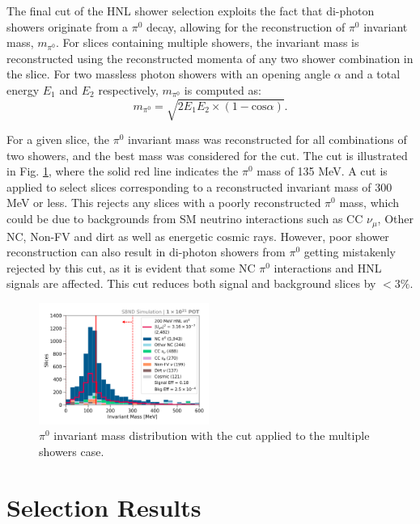 The final cut of the HNL shower selection exploits the fact that di-photon showers originate from a $\pi^0$ decay, allowing for the reconstruction of $\pi^0$ invariant mass, $m_{\pi^0}$.
For slices containing multiple showers, the invariant mass is reconstructed using the reconstructed momenta of any two shower combination in the slice.
For two massless photon showers with an opening angle $\alpha$ and a total energy $E_1$ and $E_2$ respectively, $m_{\pi^0}$ is computed as:
\begin{equation}
	m_{\pi^0} = \sqrt{2 E_1 E_2 \times (1 - \mbox{cos}\alpha)}.
\end{equation}

For a given slice, the $\pi^0$ invariant mass was reconstructed for all combinations of two showers, and the best mass was considered for the cut.
The cut is illustrated in Fig. \ref{fig:mass_cut}, where the solid red line indicates the $\pi^0$ mass of 135 MeV.
A cut is applied to select slices corresponding to a reconstructed invariant mass of 300 MeV or less.
This rejects any slices with a poorly reconstructed $\pi^0$ mass, which could be due to backgrounds from 
SM neutrino interactions such as CC $\nu_\mu$, Other NC, Non-FV and dirt as well as energetic cosmic rays.
However, poor shower reconstruction can also result in di-photon showers from $\pi^0$ getting mistakenly rejected by this cut, as it is evident that some NC $\pi^0$ interactions and HNL signals are affected.
This cut reduces both signal and background slices by $< 3 \%$.

\begin{figure}[hb!]
        \centering 
        \includegraphics[width=0.495\textwidth]{pizero_mass_precut}
	\caption[Neutral Pion Invariant Mass Cut]{
	$\pi^0$ invariant mass distribution with the cut applied to the multiple showers case.
	}
        \label{fig:mass_cut}
\end{figure}

\section{Selection Results}
\label{sec:select_result}

